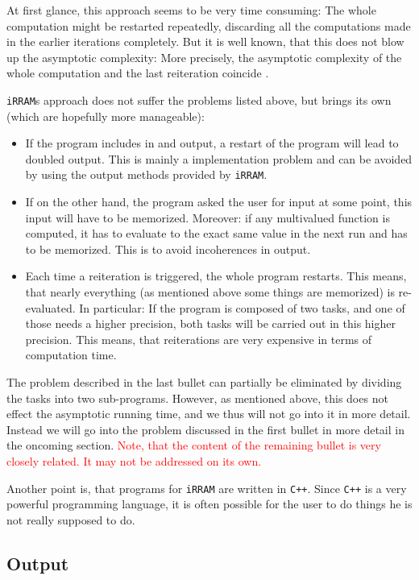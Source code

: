 \documentclass{article}
\newcommand{\irram}{\texttt{iRRAM}\xspace}
\newcommand{\irrams}{\texttt{iRRAM}s\xspace}
\newcommand{\cc}{\texttt{C++}\xspace}
\newcommand{\temp}[1]{\textcolor{red}{#1}}
\begin{document}
At first glance, this approach seems to be very time consuming: The whole computation might be restarted repeatedly, discarding all the computations made in the earlier iterations completely. But it is well known, that this does not blow up the asymptotic complexity: More precisely, the asymptotic complexity of the whole computation and the last reiteration coincide \cite{}.

\irrams approach does not suffer the problems listed above, but brings its own (which are hopefully more manageable):
\begin{itemize}
\item If the program includes in and output, a restart of the program will lead to doubled output. This is mainly a implementation problem and can be avoided by using the output methods provided by \irram.
\item If on the other hand, the program asked the user for input at some point, this input will have to be memorized. Moreover: if any multivalued function is computed, it has to evaluate to the exact same value in the next run and has to be memorized. This is to avoid incoherences in output.
\item Each time a reiteration is triggered, the whole program restarts. This means, that nearly everything (as mentioned above some things are memorized) is re-evaluated. In particular: If the program is composed of two tasks, and one of those needs a higher precision, both tasks will be carried out in this higher precision. This means, that reiterations are very expensive in terms of computation time.
\end{itemize}

The problem described in the last bullet can partially be eliminated by dividing the tasks into two sub-programs. However, as mentioned above, this does not effect the asymptotic running time, and we thus will not go into it in more detail. Instead we will go into the problem discussed in the first bullet in more detail in the oncoming section. \temp{Note, that the content of the remaining bullet is very closely related. It may not be addressed on its own.}

Another point is, that programs for \irram are written in \cc. Since \cc is a very powerful programming language, it is often possible for the user to do things he is not really supposed to do.

\subsection{Output}
\end{document}
